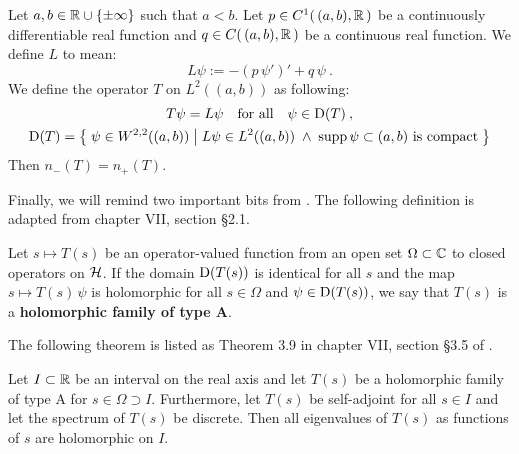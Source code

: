 \begin{thm}
    \label{thm-deficiency-diff-op}
    Let $a,b \in \mathbb{R} \cup \{ \pm\infty \}$ such that $a<b$. Let $p \in C^1( \, (a,b), \mathbb{R} \, )$ be a continuously differentiable real function and $q \in C( \, (a,b), \mathbb{R} \, )$ be a continuous real function. We define $L$ to mean:
    \begin{equation*}
        L \psi := -(p \, \psi')' + q \, \psi
        \: .
    \end{equation*}
    We define the operator $T$ on $L^2((a,b))$ as following:
    \begin{gather*}
        T \psi = L \psi
        \quad \text{for all} \quad
        \psi \in \mathrm{D}(T)
        \: ,
        \\
        \mathrm{D}(T) = \big\{\;
            \psi \in W^{2,2}((a,b))
            \;\big|\;
            L\psi \in L^2((a,b))
            \;\wedge\;
            \operatorname{supp} \psi \subset (a,b)
            \text{ is compact}
        \;\big\}
    \end{gather*}
    Then $n_-(T) = n_+(T)$.
\end{thm}

Finally, we will remind two important bits from \cite{Kato1995}. The following definition is adapted from chapter VII, section §2.1.
\begin{defn}
    \label{defn-holo-type-A}
    Let $s \mapsto T(s)$ be an operator-valued function from an open set $\Omega \subset \mathbb{C}$ to closed operators on $\mathcal{H}$. If the domain $\mathrm{D}(T(s))$ is identical for all $s$ and the map $s \mapsto T(s) \, \psi$ is holomorphic for all $s \in \Omega$ and $\psi \in \mathrm{D}(T(s))$, we say that $T(s)$ is a \textbf{holomorphic family of type A}.
\end{defn}
The following theorem is listed as Theorem 3.9 in chapter VII, section §3.5 of \cite{Kato1995}.
\begin{thm}
    \label{thm-eigenval-holo}
    Let $I\subset\mathbb{R}$ be an interval on the real axis and let $T(s)$ be a holomorphic family of type A for $s \in \Omega \supset I$. Furthermore, let $T(s)$ be self-adjoint for all $s \in I$ and let the spectrum of $T(s)$ be discrete. Then all eigenvalues of $T(s)$ as functions of $s$ are holomorphic on $I$.
\end{thm}



